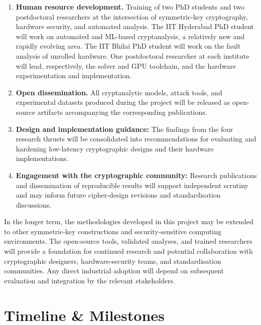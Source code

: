 \begin{enumerate}[label=\textbf{D\arabic*.}, leftmargin=*, itemsep=2pt, start=10]
  \item \textbf{Human resource development.}
        Training of two PhD students and two postdoctoral researchers at the intersection of symmetric-key cryptography, hardware security, and automated analysis.
The IIT Hyderabad PhD student will work on automated and ML-based cryptanalysis, a relatively new and rapidly evolving area.
The IIT Bhilai PhD student will work on the fault analysis of unrolled hardware.
One postdoctoral researcher at each institute will lead, respectively, the solver and GPU toolchain, and the hardware experimentation and  implementation.

  \item \textbf{Open dissemination.}
        All cryptanalytic models, attack tools, and experimental datasets produced during the project will be released as open-source artifacts accompanying the corresponding publications.

    \item \textbf{Design and implementation guidance:}
    The findings from the four research thrusts will be
    consolidated into recommendations for evaluating and
    hardening low-latency cryptographic designs and their
    hardware implementations.

    \item \textbf{Engagement with the cryptographic community:}
    Research publications and dissemination of reproducible
    results will support independent scrutiny and may inform
    future cipher-design revisions and standardisation
    discussions.
\end{enumerate}

In the longer term, the methodologies developed in this project may be extended to other symmetric-key constructions and security-sensitive computing environments. 
The open-source tools, validated analyses, and trained researchers will provide
a foundation for continued research and potential collaboration with cryptographic designers, hardware-security teams, and standardisation communities. 
Any direct industrial adoption will depend on subsequent evaluation and integration by the relevant stakeholders.



\section{Timeline \& Milestones}

